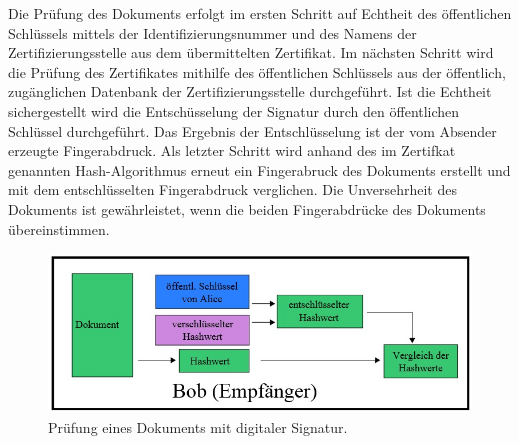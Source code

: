 Die Prüfung des Dokuments erfolgt im ersten Schritt auf Echtheit des öffentlichen Schlüssels mittels der Identifizierungsnummer und des Namens der Zertifizierungsstelle aus dem übermittelten Zertifikat. Im nächsten Schritt wird die Prüfung des Zertifikates mithilfe des öffentlichen Schlüssels aus der öffentlich, zugänglichen Datenbank der Zertifizierungsstelle durchgeführt. Ist die Echtheit sichergestellt wird die Entschüsselung der Signatur durch den öffentlichen Schlüssel durchgeführt. Das Ergebnis der Entschlüsselung ist der vom Absender erzeugte Fingerabdruck. Als letzter Schritt wird anhand des im Zertifkat genannten Hash-Algorithmus erneut ein Fingerabruck des Dokuments erstellt und mit dem entschlüsselten Fingerabdruck verglichen. Die Unversehrheit des Dokuments ist gewährleistet, wenn die beiden Fingerabdrücke des Dokuments übereinstimmen. \cite{techno1}
\begin{figure}[!ht]
    \centering
    \includegraphics[width=\textwidth]{PruefungEmpfaenger2.jpg}
    \caption[Prüfung eines Dokuments mit digitaler Signatur]{Prüfung eines Dokuments mit digitaler Signatur. \cite{techno3}}
    \label{fig:3}
\end{figure}